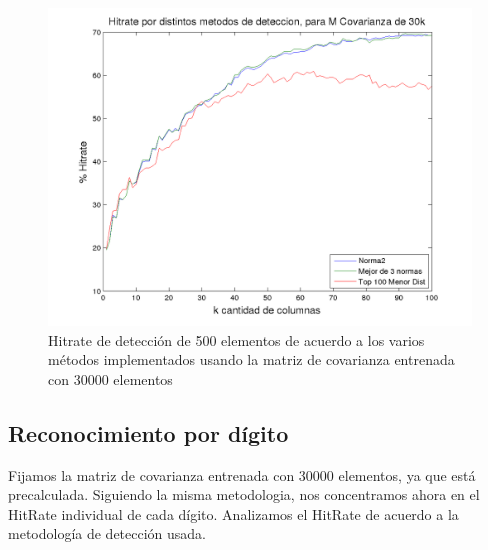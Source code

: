 \begin{figure}[H]
\begin {center}
\includegraphics[width=\hrwidth]{plots/hitrate-30kcv.png}
\end {center}
\caption{Hitrate de detecci\'on de 500 elementos de acuerdo a los varios m\'etodos implementados
usando la matriz de covarianza entrenada con 30000 elementos}
\label{fig:HR30kcv}
\end{figure}



\subsection{Reconocimiento por d\'igito}
Fijamos la matriz de covarianza entrenada con 30000 elementos, ya que est\'a precalculada.
Siguiendo la misma metodologia, nos concentramos ahora en el HitRate individual
de cada d\'igito. Analizamos el HitRate de acuerdo a la metodolog\'ia de detecci\'on usada.
\def \pdwidth {500pt}


